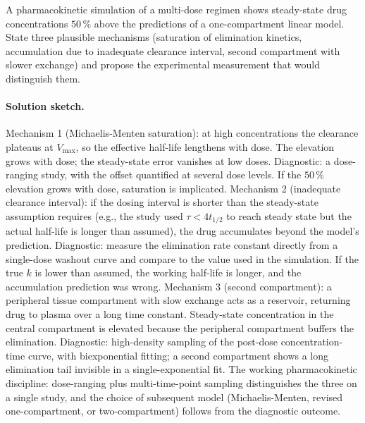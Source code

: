 \begin{exercise}
A pharmacokinetic simulation of a multi-dose regimen shows
steady-state drug concentrations $50\,\%$ above the predictions
of a one-compartment linear model. State three plausible
mechanisms (saturation of elimination kinetics, accumulation due
to inadequate clearance interval, second compartment with slower
exchange) and propose the experimental measurement that would
distinguish them.

\paragraph{Solution sketch.} Mechanism 1 (Michaelis-Menten
saturation): at high concentrations the clearance plateaus at
$V_{\max}$, so the effective half-life lengthens with dose. The
elevation grows with dose; the steady-state error vanishes at
low doses. Diagnostic: a dose-ranging study, with the offset
quantified at several dose levels. If the $50\,\%$ elevation
grows with dose, saturation is implicated. Mechanism 2
(inadequate clearance interval): if the dosing interval is
shorter than the steady-state assumption requires (e.g., the
study used $\tau < 4 t_{1/2}$ to reach steady state but the
actual half-life is longer than assumed), the drug accumulates
beyond the model's prediction. Diagnostic: measure the
elimination rate constant directly from a single-dose washout
curve and compare to the value used in the simulation. If the
true $k$ is lower than assumed, the working half-life is
longer, and the accumulation prediction was wrong. Mechanism 3
(second compartment): a peripheral tissue compartment with
slow exchange acts as a reservoir, returning drug to plasma
over a long time constant. Steady-state concentration in the
central compartment is elevated because the peripheral
compartment buffers the elimination. Diagnostic: high-density
sampling of the post-dose concentration-time curve, with
biexponential fitting; a second compartment shows a long
elimination tail invisible in a single-exponential fit. The
working pharmacokinetic discipline: dose-ranging plus
multi-time-point sampling distinguishes the three on a single
study, and the choice of subsequent model (Michaelis-Menten,
revised one-compartment, or two-compartment) follows from the
diagnostic outcome.
\end{exercise}

